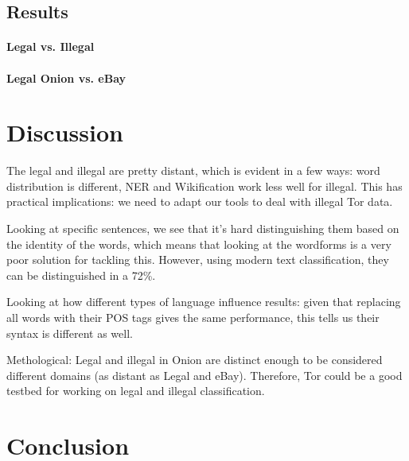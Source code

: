 \documentclass[11pt,a4paper]{article}
\begin{document}
\subsection{Results}

\paragraph{Legal vs. Illegal}

\paragraph{Legal Onion vs. eBay}


\section{Discussion}

The legal and illegal are pretty distant, which is evident in a few ways: word distribution is different, NER and Wikification work less well
for illegal. This has practical implications: we need to adapt our tools to deal with illegal Tor data. 

Looking at specific sentences, we see that it's hard distinguishing them based on the identity of the words, which means that
looking at the wordforms is a very poor solution for tackling this. However, using modern text classification, they can be distinguished
in a 72\%. 

Looking at how different types of language influence results: given that replacing all words with their POS tags gives
the same performance, this tells us their syntax is different as well.

Methological: Legal and illegal in Onion are distinct enough to be considered different domains (as distant as Legal and eBay). 
Therefore, Tor could be a good testbed for working on legal and illegal classification.


\section{Conclusion}
 














\end{document}
